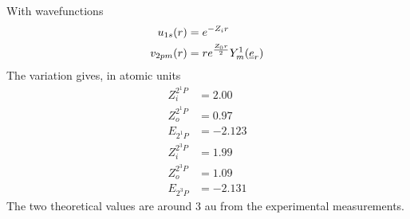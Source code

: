 \documentclass[../qm.tex]{subfiles}
\begin{document}
	With wavefunctions
	\begin{equation}
		\begin{aligned}
			u_{1s}(r)&=e^{-Z_ir}\\
			v_{2pm}(r)&=re^{\frac{Z_0r}{2}}Y^1_m(\underline{e}_{r})
		\end{aligned}
		\label{eq:wavefunctions2pstates}
	\end{equation}
	The variation gives, in atomic units
	\begin{equation*}
		\begin{aligned}
			Z_i^{2^1P}&=2.00\\
			Z_o^{2^1P}&=0.97\\
			E_{2^1P}&=-2.123\\
			Z_i^{2^3P}&=1.99\\
			Z_o^{2^3P}&=1.09\\
			E_{2^3P}&=-2.131
		\end{aligned}
	\end{equation*}
	The two theoretical values are around $3$ au from the experimental measurements.\\
\end{document}
